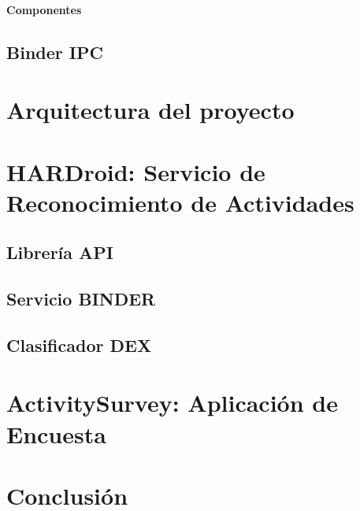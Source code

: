 \paragraph{Componentes}

\subsection{Binder IPC}

\section{Arquitectura del proyecto}

\label{sec53:arquitectura}

\section{HARDroid: Servicio de Reconocimiento de Actividades}

\label{sec54:hardroid}

\subsection{Librería API}

\subsection{Servicio BINDER}

\subsection{Clasificador DEX}

\section{ActivitySurvey: Aplicación de Encuesta}

\label{sec55:activity}

\section{Conclusión}

\label{sec56:conclusion}
